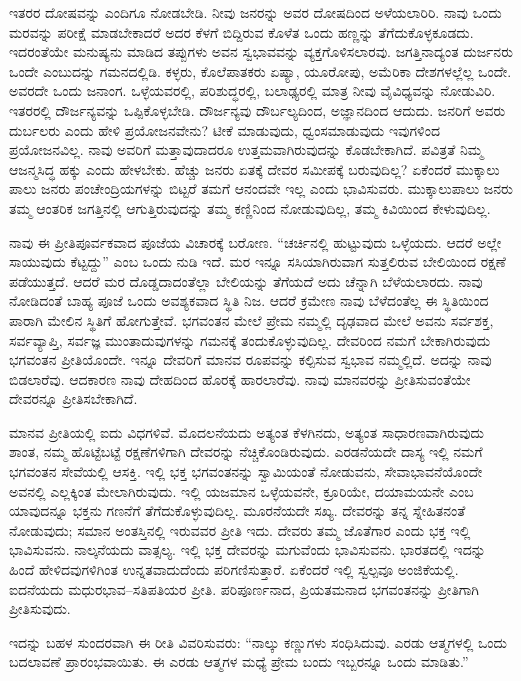 ಇತರರ ದೋಷವನ್ನು ಎಂದಿಗೂ ನೋಡಬೇಡಿ. ನೀವು ಜನರನ್ನು ಅವರ ದೋಷದಿಂದ ಅಳೆಯಲಾರಿರಿ. ನಾವು ಒಂದು ಮರವನ್ನು ಪರೀಕ್ಷೆ ಮಾಡಬೇಕಾದರೆ ಅದರ ಕೆಳಗೆ ಬಿದ್ದಿರುವ ಕೊಳೆತ ಒಂದು ಹಣ್ಣನ್ನು ತೆಗೆದುಕೊಳ್ಳಕೂಡದು. ಇದರಂತೆಯೇ ಮನುಷ್ಯನು ಮಾಡಿದ ತಪ್ಪುಗಳು ಅವನ ಸ್ವಭಾವವನ್ನು ವ್ಯಕ್ತಗೊಳಿಸಲಾರವು. ಜಗತ್ತಿನಾದ್ಯಂತ ದುರ್ಜನರು ಒಂದೇ ಎಂಬುದನ್ನು ಗಮನದಲ್ಲಿಡಿ. ಕಳ್ಳರು, ಕೊಲೆಪಾತಕರು ಏಷ್ಯಾ, ಯೂರೋಪು, ಅಮೆರಿಕಾ ದೇಶಗಳಲ್ಲೆಲ್ಲ ಒಂದೇ. ಅವರದೇ ಒಂದು ಜನಾಂಗ. ಒಳ್ಳೆಯವರಲ್ಲಿ, ಪರಿಶುದ್ಧರಲ್ಲಿ, ಬಲಾಢ್ಯರಲ್ಲಿ ಮಾತ್ರ ನೀವು ವೈವಿಧ್ಯವನ್ನು ನೋಡುವಿರಿ. ಇತರರಲ್ಲಿ ದೌರ್ಜನ್ಯವನ್ನು ಒಪ್ಪಿಕೊಳ್ಳಬೇಡಿ. ದೌರ್ಜನ್ಯವು ದೌರ್ಬಲ್ಯದಿಂದ, ಅಜ್ಞಾನದಿಂದ ಆದುದು. ಜನರಿಗೆ ಅವರು ದುರ್ಬಲರು ಎಂದು ಹೇಳಿ ಪ್ರಯೋಜನವೇನು? ಟೀಕೆ ಮಾಡುವುದು, ಧ್ವಂಸಮಾಡುವುದು ಇವುಗಳಿಂದ ಪ್ರಯೋಜನವಿಲ್ಲ. ನಾವು ಅವರಿಗೆ ಮತ್ತಾವುದಾದರೂ ಉತ್ತಮವಾಗಿರುವುದನ್ನು ಕೊಡಬೇಕಾಗಿದೆ. ಪವಿತ್ರತೆ ನಿಮ್ಮ ಆಜನ್ಮಸಿದ್ಧ ಹಕ್ಕು ಎಂದು ಹೇಳಬೇಕು. ಹೆಚ್ಚು ಜನರು ಏತಕ್ಕೆ ದೇವರ ಸಮೀಪಕ್ಕೆ ಬರುವುದಿಲ್ಲ? ಏಕೆಂದರೆ ಮುಕ್ಕಾಲು ಪಾಲು ಜನರು ಪಂಚೇಂದ್ರಿಯಗಳನ್ನು ಬಿಟ್ಟರೆ ತಮಗೆ ಆನಂದವೇ ಇಲ್ಲ ಎಂದು ಭಾವಿಸುವರು. ಮುಕ್ಕಾಲುಪಾಲು ಜನರು ತಮ್ಮ ಆಂತರಿಕ ಜಗತ್ತಿನಲ್ಲಿ ಆಗುತ್ತಿರುವುದನ್ನು ತಮ್ಮ ಕಣ್ಣಿನಿಂದ ನೋಡುವುದಿಲ್ಲ, ತಮ್ಮ ಕಿವಿಯಿಂದ ಕೇಳುವುದಿಲ್ಲ.

ನಾವು ಈ ಪ್ರೀತಿಪೂರ್ವಕವಾದ ಪೂಜೆಯ ವಿಚಾರಕ್ಕೆ ಬರೋಣ. “ಚರ್ಚಿನಲ್ಲಿ ಹುಟ್ಟುವುದು ಒಳ್ಳೆಯದು. ಆದರೆ ಅಲ್ಲೇ ಸಾಯುವುದು ಕೆಟ್ಟದ್ದು” ಎಂಬ ಒಂದು ನುಡಿ ಇದೆ. ಮರ ಇನ್ನೂ ಸಸಿಯಾಗಿರುವಾಗ ಸುತ್ತಲಿರುವ ಬೇಲಿಯಿಂದ ರಕ್ಷಣೆ ಪಡೆಯುತ್ತದೆ. ಆದರೆ ಮರ ದೊಡ್ಡದಾದಂತೆಲ್ಲಾ ಬೇಲಿಯನ್ನು ತೆಗೆಯದೆ ಅದು ಚೆನ್ನಾಗಿ ಬೆಳೆಯಲಾರದು. ನಾವು ನೋಡಿದಂತೆ ಬಾಹ್ಯ ಪೂಜೆ ಒಂದು ಅವಶ್ಯಕವಾದ ಸ್ಥಿತಿ ನಿಜ. ಆದರೆ ಕ್ರಮೇಣ ನಾವು ಬೆಳೆದಂತೆಲ್ಲ ಈ ಸ್ಥಿತಿಯಿಂದ ಪಾರಾಗಿ ಮೇಲಿನ ಸ್ಥಿತಿಗೆ ಹೋಗುತ್ತೇವೆ. ಭಗವಂತನ ಮೇಲೆ ಪ್ರೇಮ ನಮ್ಮಲ್ಲಿ ದೃಢವಾದ ಮೇಲೆ ಅವನು ಸರ್ವಶಕ್ತ, ಸರ್ವವ್ಯಾಪ್ತಿ, ಸರ್ವಜ್ಞ ಮುಂತಾದುವುಗಳನ್ನು ಗಮನಕ್ಕೆ ತಂದುಕೊಳ್ಳುವುದಿಲ್ಲ. ದೇವರಿಂದ ನಮಗೆ ಬೇಕಾಗಿರುವುದು ಭಗವಂತನ ಪ್ರೀತಿಯೊಂದೇ. ಇನ್ನೂ ದೇವರಿಗೆ ಮಾನವ ರೂಪವನ್ನು ಕಲ್ಪಿಸುವ ಸ್ವಭಾವ ನಮ್ಮಲ್ಲಿದೆ. ಅದನ್ನು ನಾವು ಬಿಡಲಾರೆವು. ಆದಕಾರಣ ನಾವು ದೇಹದಿಂದ ಹೊರಕ್ಕೆ ಹಾರಲಾರೆವು. ನಾವು ಮಾನವರನ್ನು ಪ್ರೀತಿಸುವಂತೆಯೇ ದೇವರನ್ನೂ ಪ್ರೀತಿಸಬೇಕಾಗಿದೆ.

ಮಾನವ ಪ್ರೀತಿಯಲ್ಲಿ ಐದು ವಿಧಗಳಿವೆ. ಮೊದಲನೆಯದು ಅತ್ಯಂತ ಕೆಳಗಿನದು, ಅತ್ಯಂತ ಸಾಧಾರಣವಾಗಿರುವುದು ಶಾಂತ, ನಮ್ಮ ಹೊಟ್ಟೆಬಟ್ಟೆ ರಕ್ಷಣೆಗಳಿಗಾಗಿ ದೇವರನ್ನು ನೆಚ್ಚಿಕೊಂಡಿರುವುದು. ಎರಡನೆಯದೇ ದಾಸ್ಯ ಇಲ್ಲಿ ನಮಗೆ ಭಗವಂತನ ಸೇವೆಯಲ್ಲಿ ಆಸಕ್ತಿ. ಇಲ್ಲಿ ಭಕ್ತ ಭಗವಂತನನ್ನು ಸ್ವಾಮಿಯಂತೆ ನೋಡುವನು, ಸೇವಾಭಾವನೆಯೊಂದೇ ಅವನಲ್ಲಿ ಎಲ್ಲಕ್ಕಿಂತ ಮೇಲಾಗಿರುವುದು. ಇಲ್ಲಿ ಯಜಮಾನ ಒಳ್ಳೆಯವನೇ, ಕ್ರೂರಿಯೇ, ದಯಾಮಯನೇ ಎಂಬ ಯಾವುದನ್ನೂ ಭಕ್ತನು ಗಣನೆಗೆ ತೆಗೆದುಕೊಳ್ಳುವುದಿಲ್ಲ. ಮೂರನೆಯದೇ ಸಖ್ಯ. ದೇವರನ್ನು ತನ್ನ ಸ್ನೇಹಿತನಂತೆ ನೋಡುವುದು; ಸಮಾನ ಅಂತಸ್ತಿನಲ್ಲಿ ಇರುವವರ ಪ್ರೀತಿ ಇದು. ದೇವರು ತಮ್ಮ ಜೊತೆಗಾರ ಎಂದು ಭಕ್ತ ಇಲ್ಲಿ ಭಾವಿಸುವನು. ನಾಲ್ಕನೆಯದು ವಾತ್ಸಲ್ಯ. ಇಲ್ಲಿ ಭಕ್ತ ದೇವರನ್ನು ಮಗುವೆಂದು ಭಾವಿಸುವನು. ಭಾರತದಲ್ಲಿ ಇದನ್ನು ಹಿಂದೆ ಹೇಳಿದವುಗಳಿಗಿಂತ ಉನ್ನತವಾದುದೆಂದು ಪರಿಗಣಿಸುತ್ತಾರೆ. ಏಕೆಂದರೆ ಇಲ್ಲಿ ಸ್ವಲ್ಪವೂ ಅಂಜಿಕೆಯಲ್ಲಿ. ಐದನೆಯದು ಮಧುರಭಾವ–ಸತಿಪತಿಯರ ಪ್ರೀತಿ. ಪರಿಪೂರ್ಣನಾದ, ಪ್ರಿಯತಮನಾದ ಭಗವಂತನನ್ನು ಪ್ರೀತಿಗಾಗಿ ಪ್ರೀತಿಸುವುದು.

ಇದನ್ನು ಬಹಳ ಸುಂದರವಾಗಿ ಈ ರೀತಿ ವಿವರಿಸುವರು: “ನಾಲ್ಕು ಕಣ್ಣುಗಳು ಸಂಧಿಸಿದುವು. ಎರಡು ಆತ್ಮಗಳಲ್ಲಿ ಒಂದು ಬದಲಾವಣೆ ಪ್ರಾರಂಭವಾಯಿತು. ಈ ಎರಡು ಆತ್ಮಗಳ ಮಧ್ಯೆ ಪ್ರೇಮ ಬಂದು ಇಬ್ಬರನ್ನೂ ಒಂದು ಮಾಡಿತು.”


